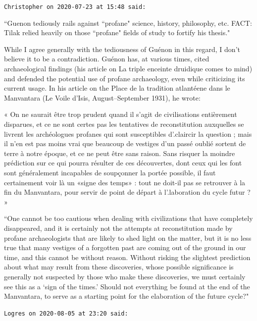 \begin{footnotesize}\begin{sffamily}



\texttt{Christopher on 2020-07-23 at 15:48 said: }

``Guenon tediously rails against ``profane" science, history, philosophy, etc. FACT: Tilak relied heavily on those ``profane" fields of study to fortify his thesis."

While I agree generally with the tediousness of Guénon in this regard, I don't believe it to be a contradiction. Guénon has, at various times, cited archaeological findings (his article on La triple enceinte druidique comes to mind) and defended the potential use of profane archaeology, even while criticizing its current usage. In his article on the Place de la tradition atlantéene dans le Manvantara (Le Voile d'Isis, August–September 1931), he wrote:

« On ne saurait être trop prudent quand il s'agit de civilisations entièrement disparues, et ce ne sont certes pas les tentatives de reconstitution auxquelles se livrent les archéologues profanes qui sont susceptibles d'.claircir la question ; mais il n'en est pas moins vrai que beaucoup de vestiges d'un passé oublié sortent de terre à notre époque, et ce ne peut être sans raison. Sans risquer la moindre prédiction sur ce qui pourra résulter de ces découvertes, dont ceux qui les font sont généralement incapables de soupçonner la portée possible, il faut certainement voir là un «signe des temps» : tout ne doit-il pas se retrouver à la fin du Manvantara, pour servir de point de départ à l'.laboration du cycle futur ? »

``One cannot be too cautious when dealing with civilizations that have completely disappeared, and it is certainly not the attempts at reconstitution made by profane archaeologists that are likely to shed light on the matter, but it is no less true that many vestiges of a forgotten past are coming out of the ground in our time, and this cannot be without reason. Without risking the slightest prediction about what may result from these discoveries, whose possible significance is generally not suspected by those who make these discoveries, we must certainly see this as a `sign of the times.' Should not everything be found at the end of the Manvantara, to serve as a starting point for the elaboration of the future cycle?"


\hfill

\texttt{Logres on 2020-08-05 at 23:20 said: }


\end{sffamily}
\end{footnotesize}
